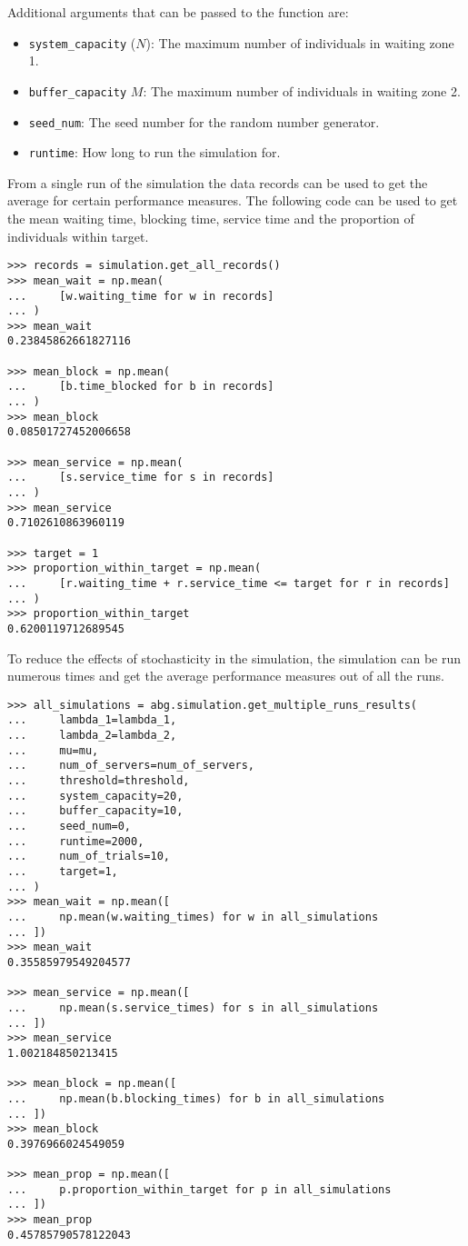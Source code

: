 Additional arguments that can be passed to the function are:
\begin{itemize}
    \item \texttt{system\_capacity} (\(N\)): The maximum number of individuals
    in waiting zone 1.
    \item \texttt{buffer\_capacity} \(M\): The maximum number of individuals in
    waiting zone 2.
    \item \texttt{seed\_num}: The seed number for the random number generator.
    \item \texttt{runtime}: How long to run the simulation for.
\end{itemize}

From a single run of the simulation the data records can be used to get the
average for certain performance measures.
The following code can be used to get the mean waiting time, blocking time,
service time and the proportion of individuals within target.

\begin{lstlisting}[style=pystyle]
>>> records = simulation.get_all_records()
>>> mean_wait = np.mean(
...     [w.waiting_time for w in records]
... )
>>> mean_wait
0.23845862661827116

>>> mean_block = np.mean(
...     [b.time_blocked for b in records]
... )
>>> mean_block
0.08501727452006658

>>> mean_service = np.mean(
...     [s.service_time for s in records]
... )
>>> mean_service
0.7102610863960119

>>> target = 1
>>> proportion_within_target = np.mean(
...     [r.waiting_time + r.service_time <= target for r in records]
... )
>>> proportion_within_target
0.6200119712689545

\end{lstlisting}

To reduce the effects of stochasticity in the simulation, the simulation can be
run numerous times and get the average performance measures out of all the runs.

\begin{lstlisting}[style=pystyle]
>>> all_simulations = abg.simulation.get_multiple_runs_results(
...     lambda_1=lambda_1,
...     lambda_2=lambda_2,
...     mu=mu,
...     num_of_servers=num_of_servers,
...     threshold=threshold,
...     system_capacity=20,
...     buffer_capacity=10,
...     seed_num=0,
...     runtime=2000,
...     num_of_trials=10,
...     target=1,
... )
>>> mean_wait = np.mean([
...     np.mean(w.waiting_times) for w in all_simulations
... ])
>>> mean_wait
0.35585979549204577

>>> mean_service = np.mean([
...     np.mean(s.service_times) for s in all_simulations
... ])
>>> mean_service
1.002184850213415

>>> mean_block = np.mean([
...     np.mean(b.blocking_times) for b in all_simulations
... ])
>>> mean_block
0.3976966024549059

>>> mean_prop = np.mean([
...     p.proportion_within_target for p in all_simulations
... ])
>>> mean_prop
0.45785790578122043

\end{lstlisting}

